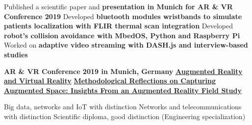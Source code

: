 \documentclass[10pt,a4paper,ragged2e,withhyper]{altacv}
\begin{document}
\newpage
{}
\begin{paracol}{2}

Published a scientific paper and \textbf{presentation in Munich for AR \& VR Conference 2019}
\smallbreak
\divider
{}
Developed \textbf{bluetooth modules wristbands to simulate patients localization with FLIR thermal scan integration}
\smallbreak
\divider
{}
Developed \textbf{robot's collision avoidance with MbedOS, Python and Raspberry Pi}
\smallbreak
\divider
{}
Worked on \textbf{adaptive video streaming with DASH.js and interview-based studies}

\medskip
{}
\smallbreak
\textbf{AR \& VR Conference 2019 in Munich, Germany}
\smallbreak
\smallbreak
{}
\smallbreak
\href{https://doi.org/10.1007/978-3-030-37869-1}{\textbf{Augmented Reality and Virtual Reality}}
\smallbreak
\href{https://www.cogitatiopress.com/mediaandcommunication/article/view/5316/2797}{\textbf{Methodological Reflections on Capturing Augmented Space: Insights From an Augmented Reality Field Study}}


\switchcolumn
\newpage

Big data, networks and IoT with distinction
\smallbreak
\divider
{}
Networks and telecommunications with distinction
\smallbreak
\divider
{}
Scientific diploma, good distinction (Engineering specialization)


\end{paracol}
\end{document}
